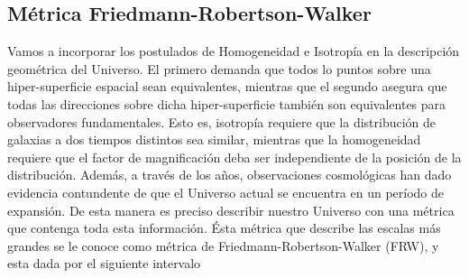 \documentclass[10.5pt,prb,
               showpacs,            %
               preprintnumbers,     %
               aps,                 %
               prl,          	    %
               letterpaper,             %
               superscriptaddress,      %
               nofootinbib,         %
               tightenlines,        %
               floats,floatfix      %
               ,usenatbib]{revtex4-1}%
\def\beq{\begin{equation}}
\def\eeq{\end{equation}}
\begin{document}
	\vspace{1em}


\subsection*{M\'etrica Friedmann-Robertson-Walker}



Vamos a incorporar los postulados de Homogeneidad e Isotrop\'ia en la descripci\'on geom\'etrica del Universo. 
El primero demanda que todos lo puntos sobre una hiper-superficie espacial sean equivalentes,
mientras que el segundo asegura que todas las direcciones sobre dicha hiper-superficie tambi\'en son 
equivalentes para observadores fundamentales. Esto es, isotrop\'ia requiere que la distribuci\'on 
de galaxias a dos tiempos distintos sea similar, mientras que la homogeneidad requiere
que el factor de magnificaci\'on deba ser independiente de la posici\'on de la distribuci\'on. 
%
Adem\'as, a trav\'es de los a\~nos, observaciones cosmol\'ogicas han dado evidencia contundente de  que 
el Universo actual se encuentra en un per\'iodo de expansi\'on. 
%
De esta manera es preciso describir nuestro Universo con una m\'etrica que contenga toda esta informaci\'on.  
\'Esta m\'etrica que describe las escalas m\'as grandes se le conoce
como m\'etrica de Friedmann-Robertson-Walker (FRW), y esta dada por el siguiente intervalo
%
%
\end{document}
